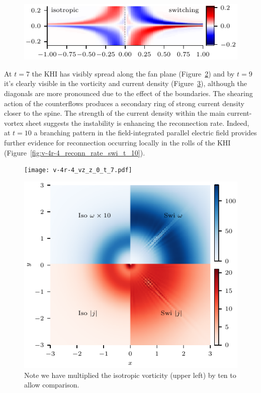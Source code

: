 \begin{figure}[t]
  \centering
  \includegraphics[width=0.9\linewidth]{v-4r-4_counterflows_t_6.pdf}
  \caption{}%
  \label{fig:v-4r-4_counterflows_t_6}
\end{figure}

At $t=7$ the KHI has visibly spread along the fan plane (Figure~\ref{fig:v-4r-4_vz_z_0_t_7}) and by $t=9$ it's clearly visible in the vorticity and current density (Figure~\ref{fig:v-4r-4_vorticity_current_ring_t_9}), although the diagonals are more pronounced due to the effect of the boundaries. The shearing action of the counterflows produces a secondary ring of strong current density closer to the spine. The strength of the current density within the main current-vortex sheet suggests the instability is enhancing the reconnection rate. Indeed, at $t=10$ a branching pattern in the field-integrated parallel electric field provides further evidence for reconnection occurring locally in the rolls of the KHI (Figure~\ref{fig:v-4r-4_reconn_rate_swi_t_10}).

\begin{figure}[t]
  \centering
  \texttt{[image: v-4r-4\_vz\_z\_0\_t\_7.pdf]}
  \caption{}%
  \label{fig:v-4r-4_vz_z_0_t_7}
\end{figure}

\begin{figure}[t]
  \centering
  \includegraphics[width=0.48\linewidth]{v-4r-4_vorticity_current_ring_t_9}
  \caption{Note we have multiplied the isotropic vorticity (upper left) by ten to allow comparison.}%
  \label{fig:v-4r-4_vorticity_current_ring_t_9}
\end{figure}

